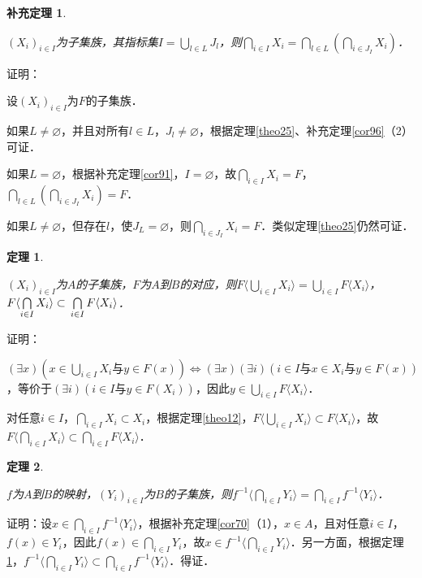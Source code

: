 \documentclass[12pt, a4paper, oneside]{book}
\newtheorem{theo}{定理}
\newtheorem{cor}{补充定理}
\begin{document}
			\begin{cor}\label{cor98}
				\hfill\par
				$(X_i)_{i\in I}$为子集族，其指标集$I=\bigcup\limits_{l\in L}J_l$，则$\bigcap\limits_{i\in I}X_i=\bigcap\limits_{l\in L}(\bigcap\limits_{i\in J_I}X_i)$．
			\end{cor}
			证明：
			\par
			设$(X_i)_{i\in I}$为$F$的子集族．
			\par
			如果$L\neq \varnothing$，并且对所有$l\in L$，$J_l\neq \varnothing$，根据定理\ref{theo25}、补充定理\ref{cor96}（2）可证．
			\par
			如果$L=\varnothing$，根据补充定理\ref{cor91}，$I=\varnothing$，故$\bigcap\limits_{i\in I}X_i=F$，$\bigcap\limits_{l\in L}(\bigcap\limits_{i\in J_I}X_i)=F$．
			\par
			如果$L\neq \varnothing$，但存在$l$，使$J_L=\varnothing$，则$\bigcap\limits_{i\in J_I}X_i=F$．类似定理\ref{theo25}仍然可证．

			\begin{theo}\label{theo26}
				\hfill\par
				$(X_i)_{i\in I}$为$A$的子集族，$F$为$A$到$B$的对应，则$F\langle\bigcup\limits_{i\in I}X_i\rangle= \bigcup\limits_{i\in I}F\langle X_i\rangle $，$F\langle\bigcap\limits_{i\in I}X_i\rangle\subset \\\bigcap\limits_{i\in I}F\langle X_i\rangle$．
			\end{theo}
			证明：
			\par
			$(\exists x)(x\in \bigcup\limits_{i\in I}X_i\text{与}y\in F(x))\Leftrightarrow (\exists x)(\exists i)(i\in I\text{与}x\in X_i\text{与}y\in F(x))$，等价于$(\exists i)(i\in I\text{与}y\in F(X_i))$，因此$y\in \bigcup\limits_{i\in I}F\langle X_i\rangle$．
			\par
			对任意$i\in I$，$\bigcap\limits_{i\in I}X_i\subset X_i$，根据定理\ref{theo12}，$F\langle\bigcup\limits_{i\in I}X_i\rangle\subset F\langle X_i\rangle $，故$F\langle\bigcap\limits_{i\in I}X_i\rangle \subset \bigcap\limits_{i\in I}F\langle X_i\rangle$．

			\begin{theo}\label{theo27}
				\hfill\par
				$f$为$A$到$B$的映射，$(Y_i)_{i\in I}$为$B$的子集族，则$f^{-1}\langle\bigcap\limits_{i\in I}Y_i\rangle= \bigcap\limits_{i\in I}f^{-1}\langle Y_i\rangle$．
			\end{theo}
			证明：设$x\in \bigcap\limits_{i\in I}f^{-1}\langle Y_i\rangle $，根据补充定理\ref{cor70}（1），$x\in A$，且对任意$i\in I$，$f(x)\in Y_i$，因此$f(x)\in \bigcap\limits_{i\in I}Y_i$，故$x\in f^{-1}\langle\bigcap\limits_{i\in I}Y_i\rangle$．另一方面，根据定理\ref{theo26}，$f^{-1}\langle\bigcap\limits_{i\in I}Y_i\rangle\subset \bigcap\limits_{i\in I}f^{-1}\langle Y_i\rangle$．得证．
\end{document}
